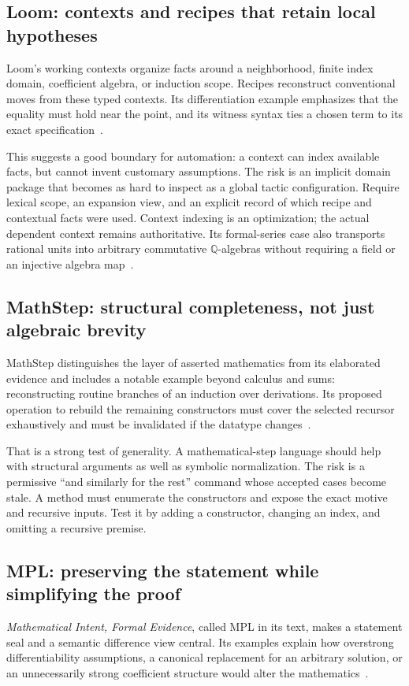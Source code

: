 \documentclass[11pt,letterpaper]{article}
\newcommand{\Q}{\mathbb Q}
\begin{document}
\subsection{Loom: contexts and recipes that retain local hypotheses}
Loom's working contexts organize facts around a neighborhood, finite index domain,
coefficient algebra, or induction scope. Recipes reconstruct conventional moves
from these typed contexts. Its differentiation example emphasizes that the equality
must hold near the point, and its witness syntax ties a chosen term to its exact
specification~\cite[\S\S4,7,8]{loom}.

This suggests a good boundary for automation: a context can index available facts,
but cannot invent customary assumptions. The risk is an implicit domain package
that becomes as hard to inspect as a global tactic configuration. Require lexical
scope, an expansion view, and an explicit record of which recipe and contextual
facts were used. Context indexing is an optimization; the actual dependent context
remains authoritative. Its formal-series case also transports rational units into
arbitrary commutative \(\Q\)-algebras without requiring a field or an injective
algebra map~\cite[\S5]{loom}.

\subsection{MathStep: structural completeness, not just algebraic brevity}
MathStep distinguishes the layer of asserted mathematics from its elaborated
evidence and includes a notable example beyond calculus and sums: reconstructing
routine branches of an induction over derivations. Its proposed operation to
rebuild the remaining constructors must cover the selected recursor exhaustively
and must be invalidated if the datatype changes~\cite[\S\S8,10.2]{mathstep}.

That is a strong test of generality. A mathematical-step language should help with
structural arguments as well as symbolic normalization. The risk is a permissive
``and similarly for the rest'' command whose accepted cases become stale. A method
must enumerate the constructors and expose the exact motive and recursive inputs.
Test it by adding a constructor, changing an index, and omitting a recursive premise.

\subsection{MPL: preserving the statement while simplifying the proof}
\emph{Mathematical Intent, Formal Evidence}, called MPL in its text, makes a
statement seal and a semantic difference view central. Its examples explain how
overstrong differentiability assumptions, a canonical replacement for an arbitrary
solution, or an unnecessarily strong coefficient structure would alter the
mathematics~\cite[\S\S6--7,12]{mpl}.
\end{document}
